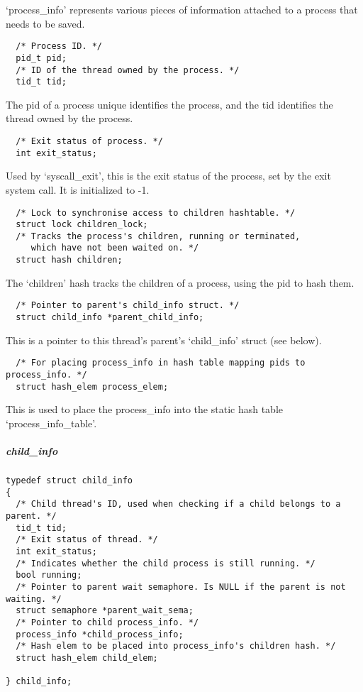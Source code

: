 `process\_info' represents various pieces of information attached to a process
that needs to be saved.

\begin{verbatim}
  /* Process ID. */
  pid_t pid;
  /* ID of the thread owned by the process. */
  tid_t tid;
\end{verbatim}

The pid of a process unique identifies the process, and the tid identifies the
thread owned by the process.

\begin{verbatim}
  /* Exit status of process. */
  int exit_status;
\end{verbatim}

Used by `syscall\_exit', this is the exit status of the process, set by the exit
system call. It is initialized to -1.

\begin{verbatim}
  /* Lock to synchronise access to children hashtable. */
  struct lock children_lock;
  /* Tracks the process's children, running or terminated,
     which have not been waited on. */
  struct hash children;
\end{verbatim}

The `children' hash tracks the children of a process, using the pid to hash
them.

\begin{verbatim}
  /* Pointer to parent's child_info struct. */
  struct child_info *parent_child_info;
\end{verbatim}

This is a pointer to this thread's parent's `child_info' struct (see below).

\begin{verbatim}
  /* For placing process_info in hash table mapping pids to process_info. */
  struct hash_elem process_elem;
\end{verbatim}

This is used to place the process_info into the static hash table
`process_info_table'.

\subparagraph{child\_info}

\begin{verbatim}
typedef struct child_info
{
  /* Child thread's ID, used when checking if a child belongs to a parent. */
  tid_t tid;
  /* Exit status of thread. */
  int exit_status;
  /* Indicates whether the child process is still running. */
  bool running;
  /* Pointer to parent wait semaphore. Is NULL if the parent is not waiting. */
  struct semaphore *parent_wait_sema;
  /* Pointer to child process_info. */
  process_info *child_process_info;
  /* Hash elem to be placed into process_info's children hash. */
  struct hash_elem child_elem;

} child_info;
\end{verbatim}

